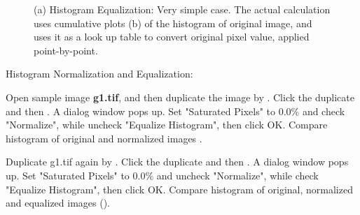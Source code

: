 \begin{figure}[H]
 \centering
 \caption{ (a) Histogram Equalization: Very simple case.
The actual calculation uses cumulative plots (b) of the histogram of original
image, and uses it as a look up table to convert original pixel value,
applied point-by-point. }
 \label{fig:equalizationSimple}
\end{figure}

\begin{indentexercise}{2}
Histogram Normalization and Equalization:
\item Open sample image \textbf{g1.tif}, and then duplicate the image by
. Click the duplicate and then . A dialog window pops up. Set "Saturated Pixels" to 0.0\% and check "Normalize", while uncheck "Equalize Histogram", then click OK.
Compare histogram of original and normalized images .  

\item Duplicate g1.tif again by . Click the
duplicate and then . A dialog window pops up. Set "Saturated
Pixels" to 0.0\% and uncheck "Normalize", while check "Equalize Histogram", then click OK.
Compare histogram of original, normalized and equalized images
().

\end{indentexercise}

